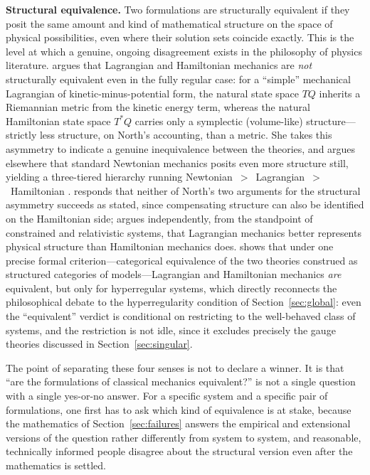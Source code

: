 \documentclass[11pt]{article}
\begin{document}
\textbf{Structural equivalence.} Two formulations are structurally equivalent if they posit the same amount and kind of mathematical structure on the space of physical possibilities, even where their solution sets coincide exactly. This is the level at which a genuine, ongoing disagreement exists in the philosophy of physics literature. \citet{north2009} argues that Lagrangian and Hamiltonian mechanics are \emph{not} structurally equivalent even in the fully regular case: for a ``simple'' mechanical Lagrangian of kinetic-minus-potential form, the natural state space $TQ$ inherits a Riemannian metric from the kinetic energy term, whereas the natural Hamiltonian state space $T^*Q$ carries only a symplectic (volume-like) structure---strictly less structure, on North's accounting, than a metric. She takes this asymmetry to indicate a genuine inequivalence between the theories, and argues elsewhere that standard Newtonian mechanics posits even more structure still, yielding a three-tiered hierarchy running Newtonian~$>$~Lagrangian~$>$~Hamiltonian \citep{north2022}. \citet{barrett2015} responds that neither of North's two arguments for the structural asymmetry succeeds as stated, since compensating structure can also be identified on the Hamiltonian side; \citet{curiel2014} argues independently, from the standpoint of constrained and relativistic systems, that Lagrangian mechanics better represents physical structure than Hamiltonian mechanics does. \citet{barrett2019} shows that under one precise formal criterion---categorical equivalence of the two theories construed as structured categories of models---Lagrangian and Hamiltonian mechanics \emph{are} equivalent, but only for hyperregular systems, which directly reconnects the philosophical debate to the hyperregularity condition of Section~\ref{sec:global}: even the ``equivalent'' verdict is conditional on restricting to the well-behaved class of systems, and the restriction is not idle, since it excludes precisely the gauge theories discussed in Section~\ref{sec:singular}.

The point of separating these four senses is not to declare a winner. It is that ``are the formulations of classical mechanics equivalent?'' is not a single question with a single yes-or-no answer. For a specific system and a specific pair of formulations, one first has to ask which kind of equivalence is at stake, because the mathematics of Section~\ref{sec:failures} answers the empirical and extensional versions of the question rather differently from system to system, and reasonable, technically informed people disagree about the structural version even after the mathematics is settled.
\end{document}

